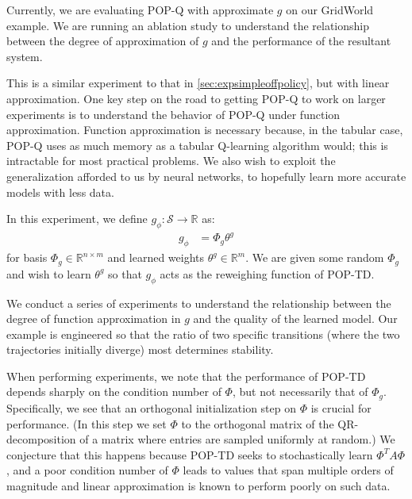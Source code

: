 Currently, we are evaluating POP-Q with approximate $g$ on our GridWorld example. We are running an ablation study to understand the relationship between the degree of approximation of $g$ and the performance of the resultant system.


This is a similar experiment to that in \cref{sec:expsimpleoffpolicy}, but with linear approximation. One key step on the road to getting POP-Q to work on larger experiments is to understand the behavior of POP-Q under function approximation. Function approximation is necessary because, in the tabular case, POP-Q uses as much memory as a tabular Q-learning algorithm would; this is intractable for most practical problems. We also wish to exploit the generalization afforded to us by neural networks, to hopefully learn more accurate models with less data.

In this experiment, we define $g_\phi : \mathcal S \to \mathbb R$ as:
\begin{align}
  g_\phi & = \Phi_g \theta^g
\end{align}
for basis $\Phi_g \in \mathbb R^{n\times m}$ and learned weights $\theta^g \in \mathbb R^{m}$. We are given some random $\Phi_g$ and wish to learn $\theta^g$ so that $g_\phi$ acts as the reweighing function of POP-TD.

We conduct a series of experiments to understand the relationship between the degree of function approximation in $g$ and the quality of the learned model. Our example is engineered so that the ratio of two specific transitions (where the two trajectories initially diverge) most determines stability.

When performing experiments, we note that the performance of POP-TD depends sharply on the condition number of $\Phi$, but not necessarily that of $\Phi_g$. Specifically, we see that an orthogonal initialization step on $\Phi$ is crucial for performance. (In this step we set $\Phi$ to the orthogonal matrix of the QR-decomposition of a matrix where entries are sampled uniformly at random.)
We conjecture that this happens because POP-TD seeks to stochastically learn $\Phi^T A \Phi$, and a poor condition number of $\Phi$ leads to values that span multiple orders of magnitude and linear approximation is known to perform poorly on such data.

